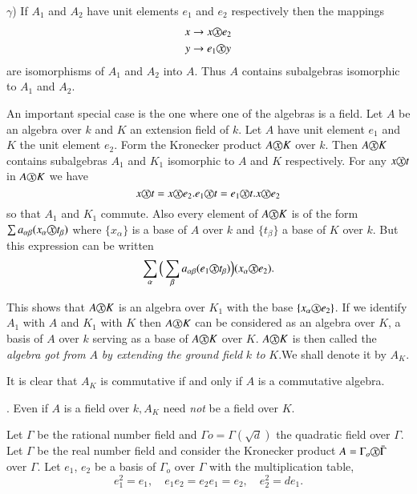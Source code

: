 $\gamma $) If $A_1$ and $A_2$ have unit elements $e_1$ and $e_2$
respectively then the mappings  
\begin{align*}
x & \rightarrow x  \text{\textcircled{$x$}}  e_2\\
y & \rightarrow  e_1  \text{\textcircled{$x$}}  y
\end{align*}
are isomorphisms of $A_1$ and $A_2$ into $A$. Thus $A$ contains
subalgebras isomorphic to $A_1$ and $A_2$. 

An important special case is the one where one of the algebras is a
field. Let $A$ be an algebra over $k$ and $K$ an extension field of
$k$. Let $A$ have unit element $e_1$ and $K$ the unit element
$e_2$. Form the Kronecker product $A \text{\textcircled{$x$}} K$ over
$k$. Then $A \text{\textcircled{$x$}}  K$ contains subalgebras $A_1$ and
$K_1$ isomorphic to $A$ and $K$ respectively. For any $x
\text{\textcircled{$x$}}  t$ in $A  \text{\textcircled{$x$}}  K$ we have  
$$
x  \text{\textcircled{$x$}}  t = x  \text{\textcircled{$x$}}  e_2. e_1 
\text{\textcircled{$x$}}  t = e_1  \text{\textcircled{$x$}}  t.  x  \text{\textcircled{$x$}}
 e_2 
$$
 so that $A_1$ and $K_1$ commute. Also every element of $A
\text{\textcircled{$x$}}  K$ is of the form $\sum a_{\alpha\beta} (x_\alpha
\text{\textcircled{$x$}}  t_\beta)$ where $\{ x_\alpha\}$ is a base of $A$ over
$k$ and $\{t_\beta \}$ a base of $K$ over $k$. But this expression can
be written 
$$
\sum_\alpha \Big(\sum_\beta a_{\alpha \beta} (e_1  \text{\textcircled{$x$}}
t_\beta)\Big) (x_\alpha  \text{\textcircled{$x$}}  e_2). 
$$

This shows that $A  \text{\textcircled{$x$}}  K$ is an algebra over $K_1$ with
the base $\{x_\alpha  \text{\textcircled{$x$}}  e_2 \}$. If we identify $A_1$
with $A$ and $K_1$ with $K$ then $A  \text{\textcircled{$x$}}  K$ can be
considered as an algebra over $K$, a basis of $A$ over $k$ serving as
a base of $A  \text{\textcircled{$x$}}  K$ over $K$. $A  \text{\textcircled{$x$}}  K$ is
then called the \textit{algebra got from} $A$ \textit{by extending
  the ground field} $k$ \textit{to} $K$.\pageoriginale We shall denote
it by $A_K$.  

It is clear that $A_K$ is commutative if and only if $A$ is a
commutative algebra. 

\medskip
{}. Even if $A$ is a field over $k, A_K$ need
\textit{not} be a field over $K$.  

Let $\Gamma$ be the rational number field and $\Gamma o =
\Gamma(\sqrt{d})$ the quadratic field over $\Gamma$. Let
$\Gamma$ be the real number field and consider the Kronecker
product $A = \Gamma_o  \text{\textcircled{$x$}}  \bar{\Gamma}$ over
$\Gamma$. Let $e_1$, $e_2$ be a basis of $\Gamma_o$ over
$\Gamma$ with the multiplication table, 
$$
e^2_1 = e_1, \quad e_1  e_2 = e_2  e_1 = e_2, \quad e^2_2 = d e_1.
$$

